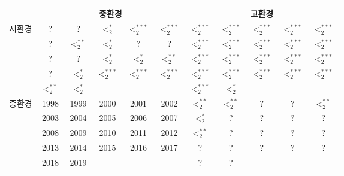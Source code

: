 \begin{tabular}{c|c|c|c|c|c|c|c|c|c|c}
\hline & \multicolumn{5}{c|}{중환경} & \multicolumn{5}{c}{고환경} \\
\hline \multirow{5}{*}{저환경} & ? & ? & $<_{2}^{*}$ & $<_{2}^{* * *}$ & $<_{2}^{* * *}$ & $<_{2}^{* * *}$ & $<_{2}^{* * *}$ & $<_{2}^{* * *}$ & $<_{2}^{* * *}$ & $<_{2}^{* * *}$ \\
\cline{2-11} & ? & $<_{2}^{* *}$ & $<_{2}^{*}$ & ? & ? & $<_{2}^{* * *}$ & $<_{2}^{* * *}$ & $<_{2}^{* * *}$ & $<_{2}^{* * *}$ & $<_{2}^{* * *}$ \\
\cline{2-11} & ? & ? & $<_{2}^{*}$ & $<_{2 }^{*}$ & $<_{2 }^{* *}$ & $<_{2 }^{* * *}$ & $<_{2}^{* * *}$ & $<_{2}^{* * *}$ & $<_{2}^{* * *}$ & $<_{2}^{* * *}$ \\
\cline{2-11} & ? & $<_{2}^{*}$ & $<_{2}^{* * *}$ & $<_{2}^{* * *}$ & $<_{2}^{* * *}$ & $<_{2}^{* * *}$ & $<_{2}^{* * *}$ & $<_{2}^{* * *}$ & $<_{2}^{* * *}$ & $<_{2}^{* * *}$ \\
\cline{2-11} & $<_{2}^{* *}$ & $<_{2}^{*}$ &  &  &  & $<_{2}^{* * *}$ & $<_{2}^{*}$ &  &  &  \\
\hline \multirow{5}{*}{중환경} & 1998 & 1999 & 2000 & 2001 & 2002 & $<_{2}^{* *}$ & $<_{2}^{* *}$ & ? & ? & $<_{2}^{* *}$ \\
\cline{2-11} & 2003 & 2004 & 2005 & 2006 & 2007 & $<_{2}^{*}$ & ? & ? & ? & ? \\
\cline{2-11} & 2008 & 2009 & 2010 & 2011 & 2012 & $<_{2}^{* *}$ & ? & ? & ? & ? \\
\cline{2-11} & 2013 & 2014 & 2015 & 2016 & 2017 & ? & ? & ? & ? & ? \\
\cline{2-11} & 2018 & 2019 & &  &  & ? & ? &  &  &  \\
\hline
\end{tabular}